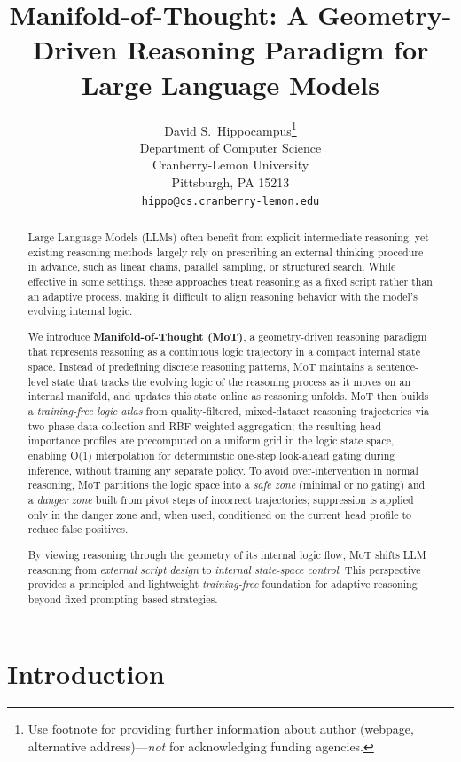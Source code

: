 \documentclass{article}
\title{Manifold-of-Thought: A Geometry-Driven Reasoning Paradigm for Large Language Models}
\author{%
  David S.~Hippocampus\thanks{Use footnote for providing further information
    about author (webpage, alternative address)---\emph{not} for acknowledging
    funding agencies.} \\
  Department of Computer Science\\
  Cranberry-Lemon University\\
  Pittsburgh, PA 15213 \\
  \texttt{hippo@cs.cranberry-lemon.edu} \\
}
\begin{document}
\maketitle

\begin{abstract}
Large Language Models (LLMs) often benefit from explicit intermediate reasoning, yet existing reasoning methods largely rely on prescribing an external thinking procedure in advance, such as linear chains, parallel sampling, or structured search. While effective in some settings, these approaches treat reasoning as a fixed script rather than an adaptive process, making it difficult to align reasoning behavior with the model's evolving internal logic.

We introduce \textbf{Manifold-of-Thought (MoT)}, a geometry-driven reasoning paradigm that represents reasoning as a continuous logic trajectory in a compact internal state space. Instead of predefining discrete reasoning patterns, MoT maintains a sentence-level state that tracks the evolving logic of the reasoning process as it moves on an internal manifold, and updates this state online as reasoning unfolds. MoT then builds a \emph{training-free logic atlas} from quality-filtered, mixed-dataset reasoning trajectories via two-phase data collection and RBF-weighted aggregation; the resulting head importance profiles are precomputed on a uniform grid in the logic state space, enabling O(1) interpolation for deterministic one-step look-ahead gating during inference, without training any separate policy. To avoid over-intervention in normal reasoning, MoT partitions the logic space into a \emph{safe zone} (minimal or no gating) and a \emph{danger zone} built from pivot steps of incorrect trajectories; suppression is applied only in the danger zone and, when used, conditioned on the current head profile to reduce false positives.

By viewing reasoning through the geometry of its internal logic flow, MoT shifts LLM reasoning from \emph{external script design} to \emph{internal state-space control}. This perspective provides a principled and lightweight \emph{training-free} foundation for adaptive reasoning beyond fixed prompting-based strategies.
\end{abstract}


\section{Introduction}
\label{sec:intro}
\end{document}

